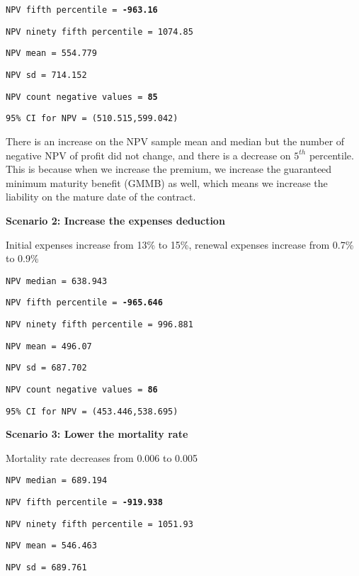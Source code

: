 \documentclass{report}
\begin{document}
{{\renewcommand\baselinestretch{1}\selectfont

\texttt{NPV fifth percentile = \textbf{-963.16}}

\texttt{NPV ninety fifth percentile = 1074.85}

\texttt{NPV mean = 554.779}

\texttt{NPV sd = 714.152}

\texttt{NPV count negative values = \textbf{85}}

\texttt{95\% CI for NPV = (510.515,599.042)}

\par}


There is an increase on the NPV sample mean and median but the number of negative NPV of profit did not change, and there is a decrease on $5^{th}$ percentile. This is because when we increase the premium, we increase the guaranteed minimum maturity benefit (GMMB) as well, which means we increase the liability on the mature date of the contract.


\textbf{Scenario 2: Increase the expenses deduction}

Initial expenses increase from 13\% to 15\%, renewal expenses increase from 0.7\% to 0.9\%


\texttt{NPV median = 638.943}

{\renewcommand\baselinestretch{1}\selectfont

\texttt{NPV fifth percentile = \textbf{-965.646}}

\texttt{NPV ninety fifth percentile = 996.881}

\texttt{NPV mean = 496.07}

\texttt{NPV sd = 687.702}

\texttt{NPV count negative values = \textbf{86}}

\texttt{95\% CI for NPV = (453.446,538.695)}
\par}



\textbf{Scenario 3: Lower the mortality rate}

Mortality rate decreases from 0.006 to 0.005

\texttt{NPV median = 689.194}

{\renewcommand\baselinestretch{1}\selectfont

\texttt{NPV fifth percentile = \textbf{-919.938}}

\texttt{NPV ninety fifth percentile = 1051.93}

\texttt{NPV mean = 546.463}

\texttt{NPV sd = 689.761}

}}
\end{document}
